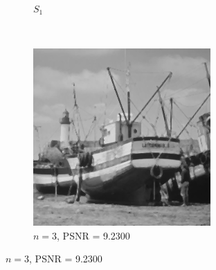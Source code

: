 \documentclass{article}
\begin{document}
\begin{enumerate}[label=(\alph*)]
\begin{figure}[!htb]
\begin{subfigure}[b]{0.3\textwidth}
            \caption{$S_1$}
        \end{subfigure}
        ~
        \begin{subfigure}[b]{0.3\textwidth}
            \includegraphics[width=\textwidth]{img/RS3.png}
            \caption{$n = 3$, PSNR = 9.2300}
        \end{subfigure}
                
        

\end{figure}
\end{enumerate}
\end{document}
